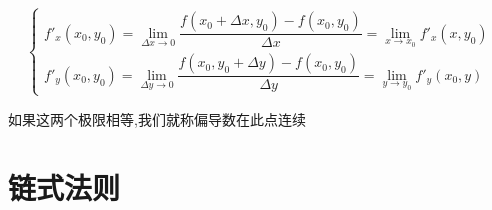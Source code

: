 \begin{definition}[偏导数连续性]
	
	$$\begin{cases}
	f'_{x}(x_{0},y_{0}) = \lim\limits_{\Delta x\rightarrow 0}\dfrac{f(x_{0}+\Delta x,y_{0})-f(x_{0},y_{0})}{\Delta x} = \lim\limits_{x\to x_{0}} f'_{x}(x,y_{0})\\
	f'_{y}(x_{0},y_{0}) = \lim\limits_{\Delta y\rightarrow 0}\dfrac{f(x_{0},y_{0}+\Delta y)-f(x_{0},y_{0})}{\Delta y} = \lim\limits_{y\to y_{0}} f'_{y}(x_{0},y)
	\end{cases}$$
	
	如果这两个极限相等,我们就称偏导数在此点连续
\end{definition}
\section{链式法则}

